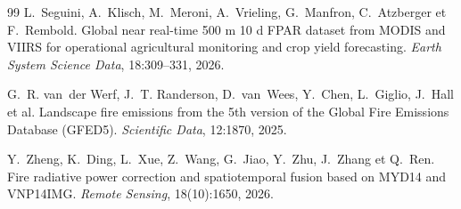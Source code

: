\documentclass[11pt,a4paper]{article}
\begin{document}
\begin{thebibliography}{99}
L.~Seguini, A.~Klisch, M.~Meroni, A.~Vrieling, G.~Manfron, C.~Atzberger et F.~Rembold.
\newblock Global near real-time 500 m 10 d FPAR dataset from MODIS and VIIRS for operational agricultural monitoring and crop yield forecasting.
\newblock \emph{Earth System Science Data}, 18:309--331, 2026.

G.~R. van~der Werf, J.~T. Randerson, D.~van~Wees, Y.~Chen, L.~Giglio, J.~Hall et al.
\newblock Landscape fire emissions from the 5th version of the Global Fire Emissions Database (GFED5).
\newblock \emph{Scientific Data}, 12:1870, 2025.

Y.~Zheng, K.~Ding, L.~Xue, Z.~Wang, G.~Jiao, Y.~Zhu, J.~Zhang et Q.~Ren.
\newblock Fire radiative power correction and spatiotemporal fusion based on MYD14 and VNP14IMG.
\newblock \emph{Remote Sensing}, 18(10):1650, 2026.

\end{thebibliography}
\end{document}
